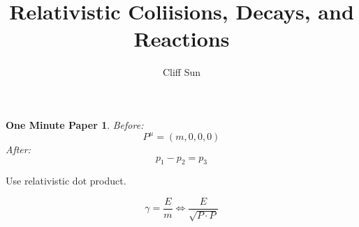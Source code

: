 \documentclass{article}
\title{Relativistic Coliisions, Decays, and Reactions}
\author{Cliff Sun}
\newtheorem{one minute paper}[theorem]{One Minute Paper}
\begin{document}
\maketitle

\begin{one minute paper}   
    Before:
    \begin{equation}
        P^{\mu} = (m, 0, 0, 0)
    \end{equation}
    After:
    \begin{equation}
        p_1 - p_2 = p_3
    \end{equation}
\end{one minute paper}

Use relativistic dot product. 

\begin{equation}
    \gamma = \frac{E}{m} \iff \frac{E}{\sqrt{P \cdot P}}
\end{equation}
\end{document}
